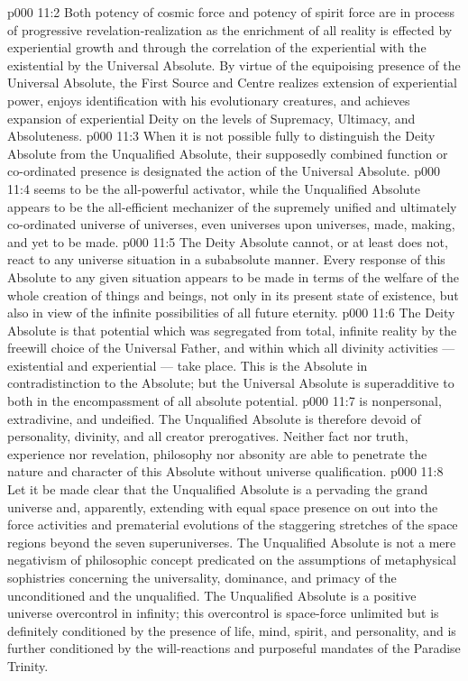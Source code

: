 \vs p000 11:2 Both potency of cosmic force and potency of spirit force are in process of progressive revelation\hyp{}realization as the enrichment of all reality is effected by experiential growth and through the correlation of the experiential with the existential by the Universal Absolute. By virtue of the equipoising presence of the Universal Absolute, the First Source and Centre realizes extension of experiential power, enjoys identification with his evolutionary creatures, and achieves expansion of experiential Deity on the levels of Supremacy, Ultimacy, and Absoluteness.
\vs p000 11:3 \pc When it is not possible fully to distinguish the Deity Absolute from the Unqualified Absolute, their supposedly combined function or co\hyp{}ordinated presence is designated the action of the Universal Absolute.
\vs p000 11:4 \bibnobreakspace {} seems to be the all\hyp{}powerful activator, while the Unqualified Absolute appears to be the all\hyp{}efficient mechanizer of the supremely unified and ultimately co\hyp{}ordinated universe of universes, even universes upon universes, made, making, and yet to be made.
\vs p000 11:5 The Deity Absolute cannot, or at least does not, react to any universe situation in a subabsolute manner. Every response of this Absolute to any given situation appears to be made in terms of the welfare of the whole creation of things and beings, not only in its present state of existence, but also in view of the infinite possibilities of all future eternity.
\vs p000 11:6 The Deity Absolute is that potential which was segregated from total, infinite reality by the freewill choice of the Universal Father, and within which all divinity activities --- existential and experiential --- take place. This is the  Absolute in contradistinction to the  Absolute; but the Universal Absolute is superadditive to both in the encompassment of all absolute potential.
\vs p000 11:7 \bibnobreakspace {} is nonpersonal, extradivine, and undeified. The Unqualified Absolute is therefore devoid of personality, divinity, and all creator prerogatives. Neither fact nor truth, experience nor revelation, philosophy nor absonity are able to penetrate the nature and character of this Absolute without universe qualification.
\vs p000 11:8 Let it be made clear that the Unqualified Absolute is a  pervading the grand universe and, apparently, extending with equal space presence on out into the force activities and prematerial evolutions of the staggering stretches of the space regions beyond the seven superuniverses. The Unqualified Absolute is not a mere negativism of philosophic concept predicated on the assumptions of metaphysical sophistries concerning the universality, dominance, and primacy of the unconditioned and the unqualified. The Unqualified Absolute is a positive universe overcontrol in infinity; this overcontrol is space\hyp{}force unlimited but is definitely conditioned by the presence of life, mind, spirit, and personality, and is further conditioned by the will\hyp{}reactions and purposeful mandates of the Paradise Trinity.
